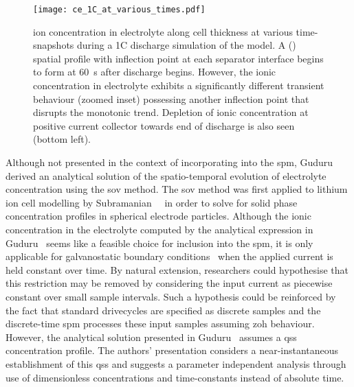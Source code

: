 \begin{figure}[!htbp]
    \centering
    \texttt{[image: ce\_1C\_at\_various\_times.pdf]}
    \caption[Electrolyte conc.\ (time-snapshots) along cell thickness for 1C
    discharge]{ ion concentration in electrolyte along cell thickness
        at various time-snapshots during a 1C discharge simulation of the
         model. A  () spatial
        profile  with inflection point at each separator interface begins to
        form at \approx \SI{60}{\second} after discharge begins. However, the
        ionic concentration in electrolyte exhibits a significantly different
        transient behaviour (zoomed inset) possessing another inflection point
        that disrupts the monotonic trend. Depletion of ionic concentration at
        positive current collector  towards end of discharge is also seen
    (bottom left).}
    \label{fig:ce1cdischgwithzoom}
\end{figure}

Although  not presented  in the  context  of incorporating  into the  \gls{spm},
Guduru~\etal~\cite{Guduru2012}   derived   an   analytical   solution   of   the
spatio-temporal  evolution  of  electrolyte concentration  using  the  \gls{sov}
method. The \gls{sov} method was first  applied to lithium ion cell modelling by
Subramanian~\etal~\cite{Subramanian2001a}  in order  to  solve  for solid  phase
concentration  profiles in  spherical  electrode particles.  Although the  ionic
concentration  in  the electrolyte  computed  by  the analytical  expression  in
Guduru~\etal{} seems like a feasible choice for inclusion into the \gls{spm}, it
is only applicable for galvanostatic  boundary conditions \ie~when the applied
current  is held  constant over  time. By  natural extension,  researchers could
hypothesise  that this  restriction  may  be removed  by  considering the  input
current as  piecewise constant  over small sample  intervals. Such  a hypothesis
could  be  reinforced  by  the  fact that  standard  drivecycles  are  specified
as  discrete  samples and  the  discrete-time  \gls{spm} processes  these  input
samples assuming \gls{zoh} behaviour. However, the analytical solution presented
in  Guduru~\etal{}  assumes  a  \gls{qss} concentration  profile.  The  authors'
presentation  considers a  near-instantaneous  establishment  of this  \gls{qss}
and  suggests a  parameter  independent analysis  through  use of  dimensionless
concentrations and time-constants instead of absolute time.

